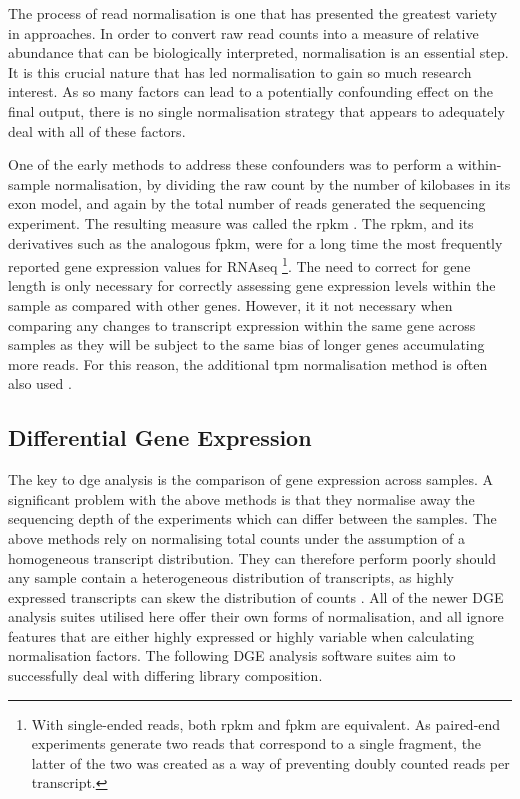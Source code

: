 The process of read normalisation is one that has presented the greatest variety in approaches. In order to convert raw read counts into a measure of relative abundance that can be biologically interpreted, normalisation is an essential step. It is this crucial nature that has led normalisation to gain so much research interest. As so many factors can lead to a potentially confounding effect on the final output, there is no single normalisation strategy that appears to adequately deal with all of these factors. 

One of the early methods to address these confounders was to perform a within-sample normalisation, by dividing the raw count by the number of kilobases in its exon model, and again by the total number of reads generated the sequencing experiment. The resulting measure was called the \acrfull{rpkm} \cite{Mortazavi2008}. The \acrshort{rpkm}, and its derivatives such as the analogous \acrfull{fpkm}, were for a long time the most frequently reported gene expression values for RNAseq \footnote[2]{With single-ended reads, both \acrshort{rpkm} and \acrshort{fpkm} are equivalent. As paired-end experiments generate two reads that correspond to a single fragment, the latter of the two was created as a way of preventing doubly counted reads per transcript.}. The need to correct for gene length is only necessary for correctly assessing gene expression levels within the sample as compared with other genes. However, it it not necessary when comparing any changes to transcript expression within the same gene across samples as they will be subject to the same bias of longer genes accumulating more reads. For this reason, the additional \acrfull{tpm} normalisation method is often also used \cite{Conesa2016}. 

\subsection{Differential Gene Expression}

The key to \acrfull{dge} analysis is the comparison of gene expression across samples. A significant problem with the above methods is that they normalise away the sequencing depth of the experiments which can differ between the samples. The above methods rely on normalising total counts under the assumption of a homogeneous transcript distribution. They can therefore perform poorly should any sample contain a heterogeneous distribution of transcripts, as highly expressed transcripts can skew the distribution of counts \cite{Bullard2010,Hansen2010,Conesa2016}. All of the newer DGE analysis suites utilised here offer their own forms of normalisation, and all ignore features that are either highly expressed or highly variable when calculating normalisation factors. The following DGE analysis software suites aim to successfully deal with differing library composition.


